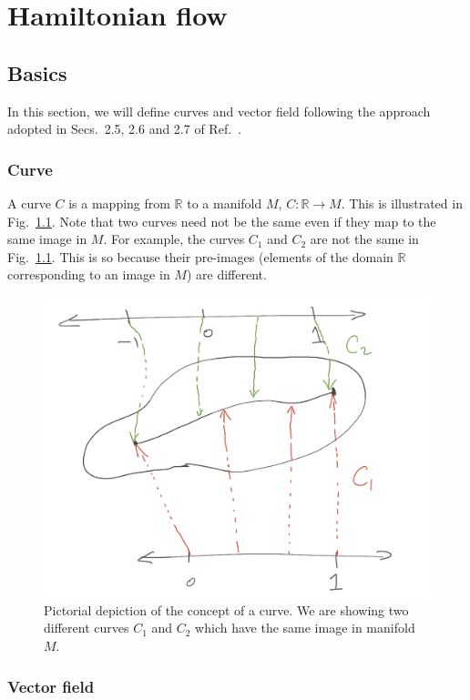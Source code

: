 \chapter{Hamiltonian flow}



\section{Basics}


In this section, we will define curves and vector field following the 
approach adopted in Secs.~2.5, 2.6 and 2.7 of Ref.~\cite{schutz1980geometrical}.



\subsection{Curve}

A curve $C$ is a mapping from $\mathbb{R}$ to a manifold $M$, $C: \mathbb{R} \rightarrow  M$.
This is illustrated in Fig.~\ref{curve}. Note that two curves need not be the same 
even if they map to the same image in $M$. For example, the curves $C_1$ and $C_2$
are not the same in Fig.~\ref{curve}. This is so because their
pre-images (elements of the domain $\mathbb{R}$
corresponding to an image in $M$) are different.




\begin{figure}
   \centering
  \includegraphics[width=0.4\linewidth]{curve}
  \caption{Pictorial  depiction of the concept of  a curve. 
  We are showing two different curves $C_1$ and $C_2$ which have the same image
  in manifold $M$.
    \vspace{-1.em}
  }
  \label{curve}
\end{figure}




\subsection{Vector field}


